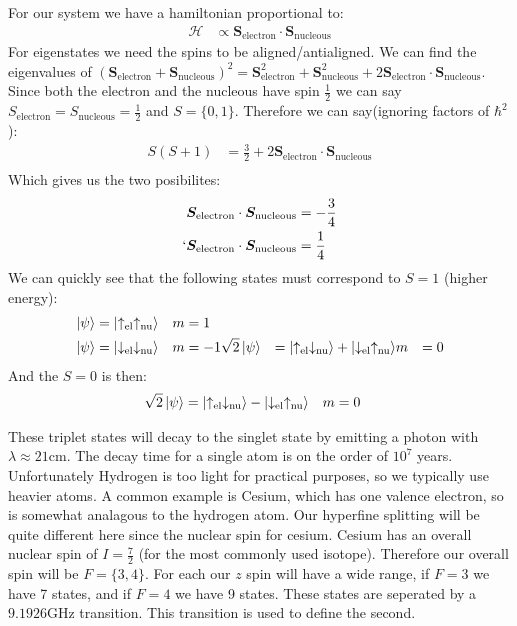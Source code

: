 For our system we have a hamiltonian proportional to:
\begin{align*}
	\mathcal{H} &\propto \bm{S}_\text{electron} \cdot\bm{S}_\text{nucleous}
\end{align*}
For eigenstates we need the spins to be aligned/antialigned. We can find the eigenvalues of $(\bm{S}_\text{electron} + \bm{S}_\text{nucleous})^2 = \bm{S}^2_\text{electron} + \bm{S}^2_\text{nucleous} + 2\bm{S}_\text{electron}\cdot\bm{S}_\text{nucleous}$. 
Since both the electron and the nucleous have spin $\frac{1}{2}$ we can say $S_\text{electron} = S_\text{nucleous} = \frac{1}{2}$ and $S = \{0,1\}$. Therefore we can say(ignoring factors of $\hbar^2$):
\begin{align*}
	S(S+1) &= \frac{3}{2} + 2\bm{S}_\text{electron}\cdot\bm{S}_\text{nucleous} \\
\end{align*}
Which gives us the two posibilites:
\begin{align*}
	\bm{S}_\text{electron}\cdot\bm{S}_\text{nucleous} &= -\frac{3}{4} \\`
	\bm{S}_\text{electron}\cdot\bm{S}_\text{nucleous} &= \frac{1}{4}
\end{align*}
We can quickly see that the following states must correspond to $S=1$ (higher energy):
\begin{align*}
	\ket{\psi} &= \ket{\uparrow_\text{el} \uparrow_\text{nu}} & m &= 1 \\ 
	\ket{\psi} &= \ket{\downarrow_\text{el}\downarrow_\text{nu}} & m &= -1
	\sqrt{2}\ket{\psi} &= \ket{\uparrow_\text{el} \downarrow_\text{nu}} + \ket{\downarrow_\text{el} \uparrow_\text{nu}} & m &= 0
\end{align*}
And the $S=0$ is then:
\begin{align*}
	\sqrt{2}\ket{\psi} &= \ket{\uparrow_\text{el} \downarrow_\text{nu}} - \ket{\downarrow_\text{el} \uparrow_\text{nu}} & m &= 0
\end{align*}

These triplet states will decay to the singlet state by emitting a photon with $\lambda \approx 21\text{cm}$. The decay time for a single atom is on the order of $10^7$ years.
Unfortunately Hydrogen is too light for practical purposes, so we typically use heavier atoms. A common example is Cesium, which has one valence electron, so is somewhat analagous to the hydrogen atom.
Our hyperfine splitting will be quite different here since the nuclear spin for cesium. Cesium has an overall nuclear spin of $I = \frac{7}{2}$ (for the most commonly used isotope).
Therefore our overall spin will be $F=\{3,4\}$. For each our $z$ spin will have a wide range, if $F=3$ we have 7 states, and if $F=4$ we have 9 states. These states are seperated by a $9.1926 \text{GHz}$ transition.
This transition is used to define the second.


